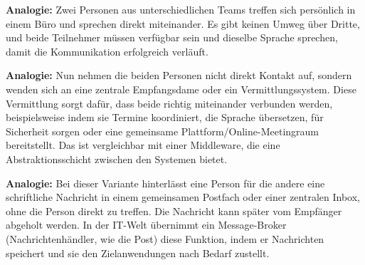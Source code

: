 \documentclass[../vs-script-first-v01.tex]{subfiles}
\begin{document}
\textbf{Analogie:} Zwei Personen aus unterschiedlichen Teams treffen sich persönlich in einem Büro und sprechen direkt miteinander. Es gibt keinen Umweg über Dritte, und beide Teilnehmer müssen verfügbar sein und dieselbe Sprache sprechen, damit die Kommunikation erfolgreich verläuft.


\textbf{Analogie:} Nun nehmen die beiden Personen nicht direkt Kontakt auf, sondern wenden sich an eine zentrale Empfangsdame oder ein Vermittlungssystem. Diese Vermittlung sorgt dafür, dass beide richtig miteinander verbunden werden, beispielsweise indem sie Termine koordiniert, die Sprache übersetzen, für Sicherheit sorgen oder eine gemeinsame Plattform/Online-Meetingraum bereitstellt. Das ist vergleichbar mit einer Middleware, die eine Abstraktionsschicht zwischen den Systemen bietet.


\textbf{Analogie:}  Bei dieser Variante hinterlässt eine Person für die andere eine schriftliche Nachricht in einem gemeinsamen Postfach oder einer zentralen Inbox, ohne die Person direkt zu treffen. Die Nachricht kann später vom Empfänger abgeholt werden. In der IT-Welt übernimmt ein Message-Broker (Nachrichtenhändler, wie die Post) diese Funktion, indem er Nachrichten speichert und sie den Zielanwendungen nach Bedarf zustellt.

\end{document}
